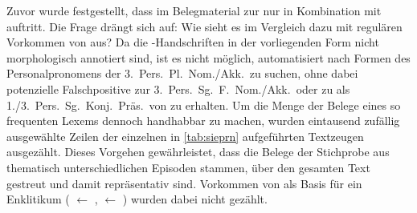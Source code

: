 	





Zuvor wurde festgestellt, dass im Belegmaterial zur \citet{kc} nur
 in Kombination mit  auftritt. Die Frage drängt sich
auf: Wie sieht es im Vergleich dazu mit regulären Vorkommen von  aus?
Da die \citet{kc}-Hand\-schrif\-ten in der vorliegenden Form nicht
morphologisch annotiert sind, ist es nicht möglich, automatisiert nach Formen
des Personal\-pronomens der 3.~Pers.\ Pl.\ Nom./Akk.\ zu suchen, ohne dabei
potenzielle Falschpositive zur 3.~Pers.\ Sg.~F.\ Nom./Akk.\ oder zu 
als 1./3.~Pers.\ Sg.\ Konj.\ Präs.\ von   zu erhalten. Um
die Menge der Belege eines so frequenten Lexems dennoch handhabbar zu machen,
wurden eintausend zufällig ausgewählte Zeilen der einzelnen in
\cref{tab:sieprn} aufgeführten Textzeugen ausgezählt. Dieses Vorgehen
gewährleistet, dass die Belege der Stichprobe aus thematisch unterschiedlichen
Episoden stammen, über den gesamten Text gestreut und damit repräsentativ sind.
Vorkommen von  als Basis für ein Enklitikum ( $\gets$
 ,
 $\gets$  ) wurden dabei nicht gezählt.

